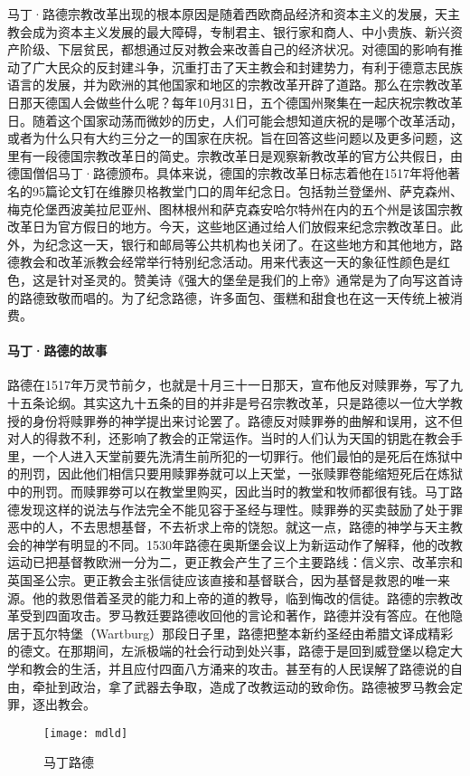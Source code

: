 马丁·路德宗教改革出现的根本原因是随着西欧商品经济和资本主义的发展，天主教会成为资本主义发展的最大障碍，专制君主、银行家和商人、中小贵族、新兴资产阶级、下层贫民，都想通过反对教会来改善自己的经济状况。对德国的影响有推动了广大民众的反封建斗争，沉重打击了天主教会和封建势力，有利于德意志民族语言的发展，并为欧洲的其他国家和地区的宗教改革开辟了道路。那么在宗教改革日那天德国人会做些什么呢？每年10月31日，五个德国州聚集在一起庆祝宗教改革日。随着这个国家动荡而微妙的历史，人们可能会想知道庆祝的是哪个改革活动，或者为什么只有大约三分之一的国家在庆祝。旨在回答这些问题以及更多问题，这里有一段德国宗教改革日的简史。宗教改革日是观察新教改革的官方公共假日，由德国僧侣马丁·路德颁布。具体来说，德国的宗教改革日标志着他在1517年将他著名的95篇论文钉在维滕贝格教堂门口的周年纪念日。包括勃兰登堡州、萨克森州、梅克伦堡西波美拉尼亚州、图林根州和萨克森安哈尔特州在内的五个州是该国宗教改革日为官方假日的地方。今天，这些地区通过给人们放假来纪念宗教改革日。此外，为纪念这一天，银行和邮局等公共机构也关闭了。在这些地方和其他地方，路德教会和改革派教会经常举行特别纪念活动。用来代表这一天的象征性颜色是红色，这是针对圣灵的。赞美诗《强大的堡垒是我们的上帝》通常是为了向写这首诗的路德致敬而唱的。为了纪念路德，许多面包、蛋糕和甜食也在这一天传统上被消费。

\paragraph{马丁·路德的故事}
路德在1517年万灵节前夕，也就是十月三十一日那天，宣布他反对赎罪券，写了九十五条论纲。其实这九十五条的目的并非是号召宗教改革，只是路德以一位大学教授的身份将赎罪券的神学提出来讨论罢了。路德反对赎罪券的曲解和误用，这不但对人的得救不利，还影响了教会的正常运作。当时的人们认为天国的钥匙在教会手里，一个人进入天堂前要先洗清生前所犯的一切罪行。他们最怕的是死后在炼狱中的刑罚，因此他们相信只要用赎罪券就可以上天堂，一张赎罪卷能缩短死后在炼狱中的刑罚。而赎罪劵可以在教堂里购买，因此当时的教堂和牧师都很有钱。马丁路德发现这样的说法与作法完全不能见容于圣经与理性。赎罪券的买卖鼓励了处于罪恶中的人，不去思想基督，不去祈求上帝的饶恕。就这一点，路德的神学与天主教会的神学有明显的不同。1530年路德在奥斯堡会议上为新运动作了解释，他的改教运动已把基督教欧洲一分为二，更正教会产生了三个主要路线：信义宗、改革宗和英国圣公宗。更正教会主张信徒应该直接和基督联合，因为基督是救恩的唯一来源。他的救恩借着圣灵的能力和上帝的道的教导，临到悔改的信徒。路德的宗教改革受到四面攻击。罗马教廷要路德收回他的言论和著作，路德并没有答应。在他隐居于瓦尔特堡（Wartburg）那段日子里，路德把整本新约圣经由希腊文译成精彩的德文。在那期间，左派极端的社会行动到处兴事，路德于是回到威登堡以稳定大学和教会的生活，并且应付四面八方涌来的攻击。甚至有的人民误解了路德说的自由，牵扯到政治，拿了武器去争取，造成了改教运动的致命伤。路德被罗马教会定罪，逐出教会。
\begin{figure}[htb]
    \centering
    \texttt{[image: mdld]}
    \caption{马丁路德}
    
\end{figure}

